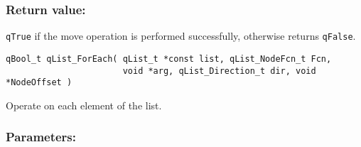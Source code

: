 \subsubsection*{Return value:}
\lstinline{qTrue} if the move operation is performed successfully, otherwise  returns \lstinline{qFalse}.  

\noindent\hrulefill

\begin{lstlisting}[style=CStyle]
qBool_t qList_ForEach( qList_t *const list, qList_NodeFcn_t Fcn, 
                       void *arg, qList_Direction_t dir, void *NodeOffset )
\end{lstlisting} 

Operate on each element of the list.

\subsubsection*{Parameters:}
